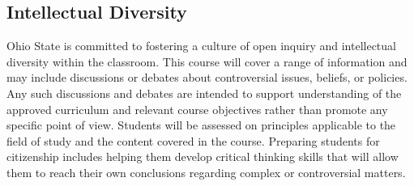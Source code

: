 \documentclass{ximera}
\begin{document}
\subsection*{Intellectual Diversity}
Ohio State is committed to fostering a culture of open inquiry and intellectual diversity within the classroom. This course will cover a range of information and may include discussions or debates about controversial issues, beliefs, or policies. Any such discussions and debates are intended to support understanding of the approved curriculum and relevant course objectives rather than promote any specific point of view. Students will be assessed on principles applicable to the field of study and the content covered in the course. Preparing students for citizenship includes helping them develop critical thinking skills that will allow them to reach their own conclusions regarding complex or controversial matters.
\end{document}
